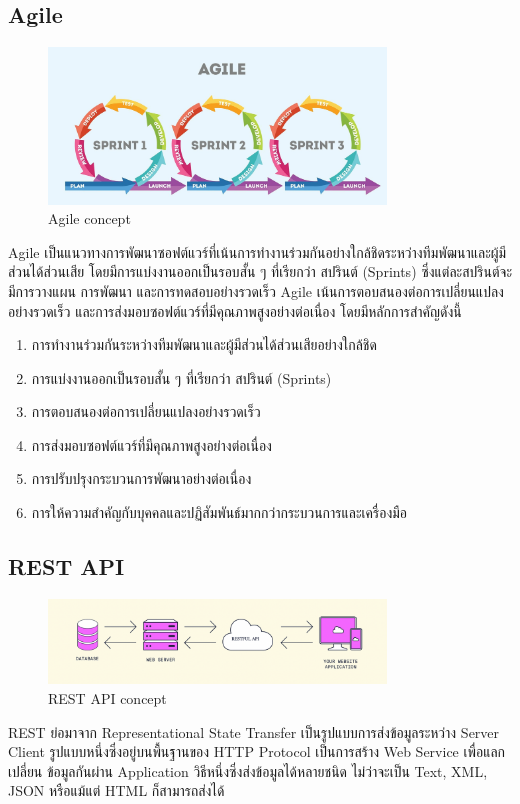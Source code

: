   \subsection{Agile}
    \begin{figure}[!ht]
      \centering
      \includegraphics[width=0.8\textwidth]{image/Background/Agile-software.jpeg}
      \caption[Agile]{Agile concept}
      \label{fig:agile_pic}
    \end{figure}
    \FloatBarrier
    \qquad Agile เป็นแนวทางการพัฒนาซอฟต์แวร์ที่เน้นการทำงานร่วมกันอย่างใกล้ชิดระหว่างทีมพัฒนาและผู้มีส่วนได้ส่วนเสีย
    โดยมีการแบ่งงานออกเป็นรอบสั้น ๆ ที่เรียกว่า สปรินต์ (Sprints) ซึ่งแต่ละสปรินต์จะมีการวางแผน การพัฒนา และการทดสอบอย่างรวดเร็ว
    Agile เน้นการตอบสนองต่อการเปลี่ยนแปลงอย่างรวดเร็ว และการส่งมอบซอฟต์แวร์ที่มีคุณภาพสูงอย่างต่อเนื่อง โดยมีหลักการสำคัญดังนี้ \cite{Agile}
    \begin{enumerate}
      \item การทำงานร่วมกันระหว่างทีมพัฒนาและผู้มีส่วนได้ส่วนเสียอย่างใกล้ชิด
      \item การแบ่งงานออกเป็นรอบสั้น ๆ ที่เรียกว่า สปรินต์ (Sprints)
      \item การตอบสนองต่อการเปลี่ยนแปลงอย่างรวดเร็ว
      \item การส่งมอบซอฟต์แวร์ที่มีคุณภาพสูงอย่างต่อเนื่อง
      \item การปรับปรุงกระบวนการพัฒนาอย่างต่อเนื่อง
      \item การให้ความสำคัญกับบุคคลและปฏิสัมพันธ์มากกว่ากระบวนการและเครื่องมือ
    \end{enumerate}
  \subsection{REST API}
    \begin{figure}[!h]
      \centering
      \includegraphics[width=0.8\textwidth]{image/Background/REST-API.png}
      \caption[REST API]{REST API concept}
      \label{fig:api_pic}
    \end{figure}
    \qquad REST ย่อมาจาก Representational State Transfer เป็นรูปแบบการส่งข้อมูลระหว่าง Server Client
    รูปแบบหนึ่งซึ่งอยู่บนพื้นฐานของ HTTP Protocol เป็นการสร้าง Web Service เพื่อแลกเปลี่ยน ข้อมูลกันผ่าน Application
    วิธีหนึ่งซึ่งส่งข้อมูลได้หลายชนิด ไม่ว่าจะเป็น Text, XML, JSON หรือแม้แต่ HTML ก็สามารถส่งได้ \cite{API}
    

